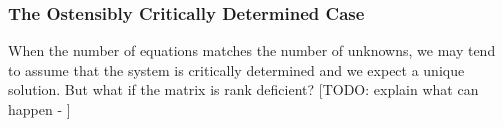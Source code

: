 





\subsubsection{The Ostensibly Critically Determined Case}
When the number of equations matches the number of unknowns, we may tend to assume that the system is critically determined and we expect a unique solution. But what if the matrix is rank deficient? [TODO: explain what can happen - ] %


